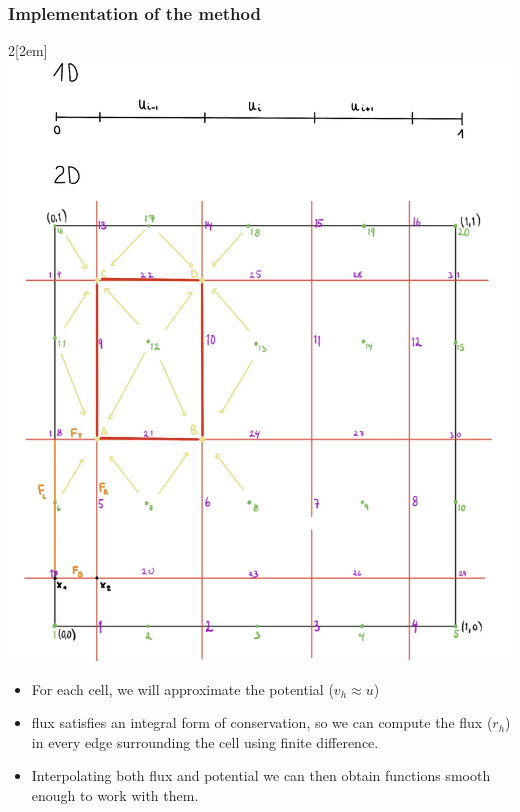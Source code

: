 \documentclass[t]{beamer}
\begin{document}
\begin{frame}
\frametitle{Implementation of the method}
\begin{multicols}{2}[\columnsep2em] 
\includegraphics[width=\linewidth]{square.jpg}
\columnbreak
\begin{itemize}
	\item For each cell, we will approximate the potential ($v_h \approx u$)
	\item flux satisfies an integral form of conservation, so we can compute the flux ($r_h$) in every edge surrounding the cell using finite difference.
	\item Interpolating both flux and potential we can then obtain functions smooth enough to work with them. 
\end{itemize}

\end{multicols}

\end{frame}
\end{document}
